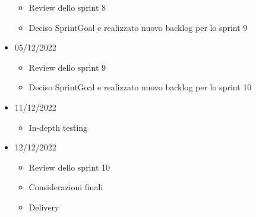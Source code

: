 \begin{itemize}
        \begin{itemize}
            \item Review dello sprint 8
            \item Deciso SprintGoal e realizzato nuovo backlog per lo sprint 9
        \end{itemize}
    \item 05/12/2022
        \begin{itemize}
            \item Review dello sprint 9
            \item Deciso SprintGoal e realizzato nuovo backlog per lo sprint 10
        \end{itemize}
    \item 11/12/2022
        \begin{itemize}
            \item In-depth testing
        \end{itemize}
    \item 12/12/2022
        \begin{itemize}
            \item Review dello sprint 10
            \item Considerazioni finali
            \item Delivery
        \end{itemize}
\end{itemize}

